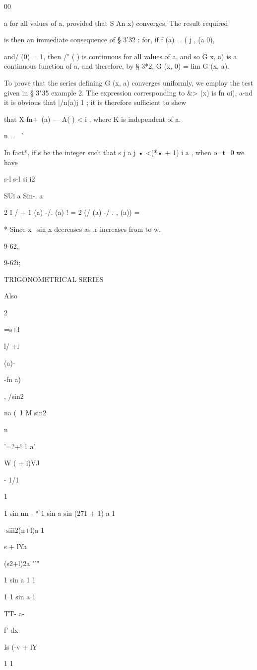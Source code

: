 00

a for all values of a, provided that S An x) converges. The result
required

is then an immediate consequence of § 3'32 : for, if f (a) = ( j , (a
0),

and/ (0) = 1, then /" ( ) is continuous for all values of a, and so G
x, a) is a continuous function of a, and therefore, by § 3*2, G (x, 0)
= lim G (x, a).

To prove that the series defining G (x, a) converges uniformly, we
employ the test given in § 3"35 example 2. The expression
corresponding to \&> (x) is fn oi), a-nd it is obvious that |/n(a)j 1
; it is therefore sufficient to shew

that X fn+\ (a) — A( ) < i , where K is independent of a.

n = \ '

In fact*, if s be the integer such that s j a j • <(*• + 1) i a , when
o=t=0 we have

s-l s-l si i2

SUi a Sin-. a

2 I / + 1 (a) -/. (a) ! = 2 (/ (a) -/ . , (a)) =

* Since x~ sin x decreases as .r increases from to w.

9-62,

9-62i;

TRIGONOMETRICAL SERIES

Also

2

=s+l

l/ +l

(a)-

-fn a)

, /sin2

na (\ 1 M sin2

n

'=?+! 1 a'

W ( + i)VJ

- 1/1

1

1 sin nn - * 1 sin a sin (271 + 1) a 1

-siii2(n+l)a 1

  s + lYa \

 (s2+l)2a "'"

1 sin a 1 1

1 1 sin a 1

TT- a-

f' dx

Is (-v + lY

1 1

